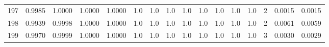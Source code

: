 \begin{tabular}{lrrrrrrrrrrrrrrr}
197 &      0.9985 &  1.0000 &  1.0000 &  1.0000 &     1.0 &     1.0 &     1.0 &     1.0 &     1.0 &     1.0 &      1.0 &        1.0 &      2 &                    0.0015 &                     0.0015 \\
198 &      0.9939 &  0.9998 &  1.0000 &  1.0000 &     1.0 &     1.0 &     1.0 &     1.0 &     1.0 &     1.0 &      1.0 &        1.0 &      2 &                    0.0061 &                     0.0059 \\
199 &      0.9970 &  0.9999 &  1.0000 &  1.0000 &     1.0 &     1.0 &     1.0 &     1.0 &     1.0 &     1.0 &      1.0 &        1.0 &      3 &                    0.0030 &                     0.0029 \\
\bottomrule
\end{tabular}
